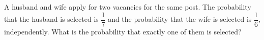 A husband and wife apply for two vacancies for the same post. The probability that the husband is selected is $\dfrac{1}{7}$ and the probability that the wife is selected is $\dfrac{1}{6}$, independently. What is the probability that exactly one of them is selected?
